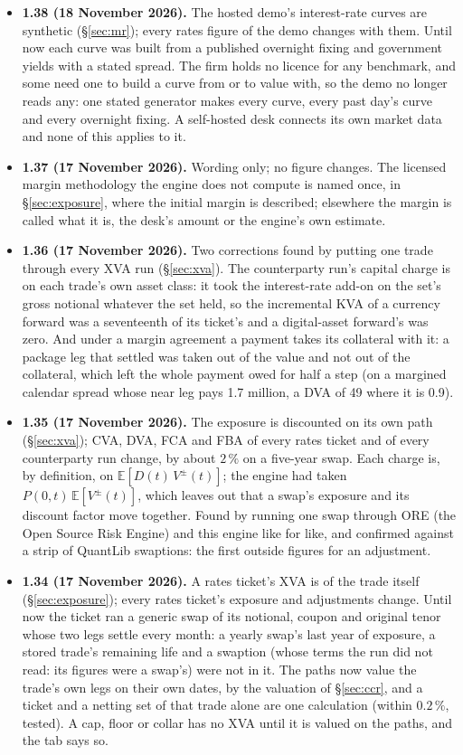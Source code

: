 \documentclass[11pt,a4paper]{article}
\newcommand{\E}{\mathbb{E}}
\begin{document}
{\begin{itemize}[leftmargin=1.4em, itemsep=4pt]
\item \textbf{1.38 (18 November 2026).} The hosted demo's interest-rate curves are synthetic (\S\ref{sec:mr}); every rates figure of the demo changes with them. Until now each curve was built from a published overnight fixing and government yields with a stated spread. The firm holds no licence for any benchmark, and some need one to build a curve from or to value with, so the demo no longer reads any: one stated generator makes every curve, every past day's curve and every overnight fixing. A self-hosted desk connects its own market data and none of this applies to it.
\item \textbf{1.37 (17 November 2026).} Wording only; no figure changes. The licensed margin methodology the engine does not compute is named once, in \S\ref{sec:exposure}, where the initial margin is described; elsewhere the margin is called what it is, the desk's amount or the engine's own estimate.
\item \textbf{1.36 (17 November 2026).} Two corrections found by putting one trade through every XVA run (\S\ref{sec:xva}). The counterparty run's capital charge is on each trade's own asset class: it took the interest-rate add-on on the set's gross notional whatever the set held, so the incremental KVA of a currency forward was a seventeenth of its ticket's and a digital-asset forward's was zero. And under a margin agreement a payment takes its collateral with it: a package leg that settled was taken out of the value and not out of the collateral, which left the whole payment owed for half a step (on a margined calendar spread whose near leg pays 1.7 million, a DVA of 49 where it is 0.9).
\item \textbf{1.35 (17 November 2026).} The exposure is discounted on its own path (\S\ref{sec:xva}); CVA, DVA, FCA and FBA of every rates ticket and of every counterparty run change, by about $2\,\%$ on a five-year swap. Each charge is, by definition, on $\E[D(t)\,V^{\pm}(t)]$; the engine had taken $P(0,t)\,\E[V^{\pm}(t)]$, which leaves out that a swap's exposure and its discount factor move together. Found by running one swap through ORE (the Open Source Risk Engine) and this engine like for like, and confirmed against a strip of QuantLib swaptions: the first outside figures for an adjustment.
\item \textbf{1.34 (17 November 2026).} A rates ticket's XVA is of the trade itself (\S\ref{sec:exposure}); every rates ticket's exposure and adjustments change. Until now the ticket ran a generic swap of its notional, coupon and original tenor whose two legs settle every month: a yearly swap's last year of exposure, a stored trade's remaining life and a swaption (whose terms the run did not read: its figures were a swap's) were not in it. The paths now value the trade's own legs on their own dates, by the valuation of \S\ref{sec:ccr}, and a ticket and a netting set of that trade alone are one calculation (within $0.2\,\%$, tested). A cap, floor or collar has no XVA until it is valued on the paths, and the tab says so.

\end{itemize}}
\end{document}
